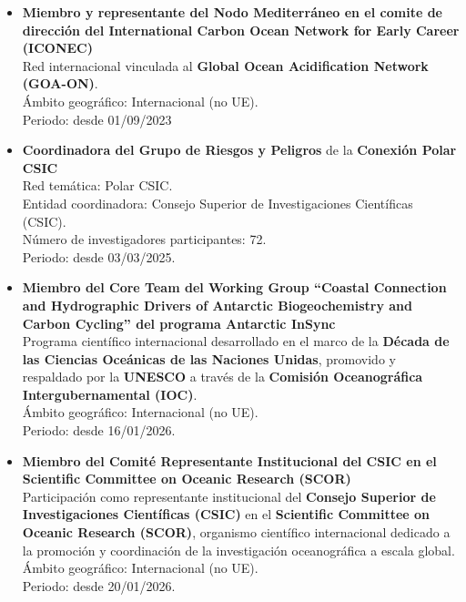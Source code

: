 \documentclass[11pt,a4paper]{article}
\begin{document}
\begin{itemize}[leftmargin=*]

    \item \textbf{Miembro y representante del Nodo Mediterráneo en el comite de dirección del International Carbon Ocean Network for Early Career (ICONEC)}\\
    Red internacional vinculada al \textbf{Global Ocean Acidification Network (GOA-ON)}.\\
    Ámbito geográfico: Internacional (no UE).\\
    Periodo: desde 01/09/2023 
    
    \item \textbf{Coordinadora del Grupo de Riesgos y Peligros} de la \textbf{Conexión Polar CSIC}\\
    Red temática: Polar CSIC.\\
    Entidad coordinadora: Consejo Superior de Investigaciones Científicas (CSIC).\\
    Número de investigadores participantes: 72.\\
    Periodo: desde 03/03/2025.

    \item \textbf{Miembro del Core Team del Working Group ``Coastal Connection and Hydrographic Drivers of Antarctic Biogeochemistry and Carbon Cycling'' del programa Antarctic InSync}\\
    Programa científico internacional desarrollado en el marco de la \textbf{Década de las Ciencias Oceánicas de las Naciones Unidas}, promovido y respaldado por la \textbf{UNESCO} a través de la \textbf{Comisión Oceanográfica Intergubernamental (IOC)}.\\
    Ámbito geográfico: Internacional (no UE).\\
    Periodo: desde 16/01/2026.

   \item \textbf{Miembro del Comité Representante Institucional del CSIC en el Scientific Committee on Oceanic Research (SCOR)}\\
    Participación como representante institucional del \textbf{Consejo Superior de Investigaciones Científicas (CSIC)} en el \textbf{Scientific Committee on Oceanic Research (SCOR)}, organismo científico internacional dedicado a la promoción y coordinación de la investigación oceanográfica a escala global.\\
    Ámbito geográfico: Internacional (no UE).\\
    Periodo: desde 20/01/2026.


\end{itemize}
\end{document}
